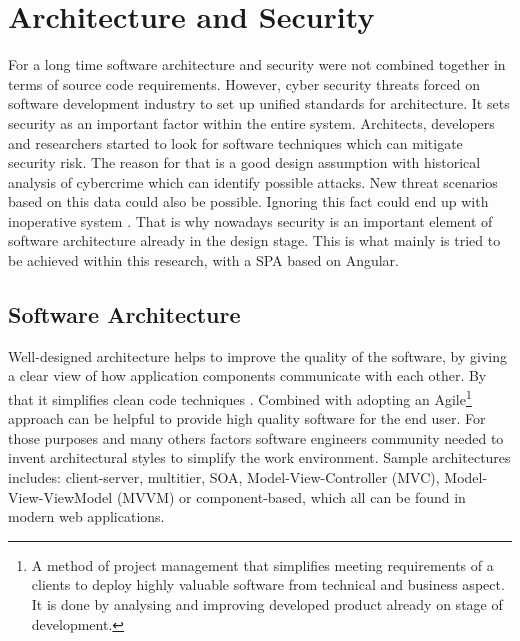 \documentclass{article} %
\begin{document}
\section {Architecture and Security}
\normalsize For a long time software architecture and security were not combined together in terms of source code requirements. However, cyber security threats forced on software development industry to set up unified standards for architecture. It sets security as an important factor within the entire system. Architects, developers and researchers started to look for software techniques which can mitigate security risk. The reason for that is a good design assumption with historical analysis of cybercrime which can identify possible attacks. New threat scenarios based on this data could also be possible. Ignoring this fact could end up with inoperative system \cite{bib:software_architecture_security}. That is why nowadays security is an important element of software architecture already in the design stage. This is what mainly is tried to be achieved within this research, with a SPA based on Angular.
\subsection{Software Architecture}
Well-designed architecture helps to improve the quality of the software, by giving a clear view of how application components communicate with each other. By that it simplifies clean code techniques \cite{bib:software_architecture}. Combined with adopting an Agile\footnote{A method of project management that simplifies meeting requirements of a clients to deploy highly valuable software from technical and business aspect. It is done by analysing and improving developed product already on stage of development.} approach can be helpful to provide high quality software for the end user. For those purposes and many others factors software engineers community needed to invent architectural styles to simplify the work environment. Sample architectures includes: client-server, multitier, SOA, Model-View-Controller (MVC), Model-View-ViewModel (MVVM) or component-based, which all can be found in modern web applications.
\end{document}
